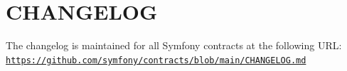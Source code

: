 \chapter{CHANGELOG }
\hypertarget{md_vendor_2symfony_2deprecation-contracts_2_c_h_a_n_g_e_l_o_g}{}\label{md_vendor_2symfony_2deprecation-contracts_2_c_h_a_n_g_e_l_o_g}
The changelog is maintained for all Symfony contracts at the following URL:\+ \href{https://github.com/symfony/contracts/blob/main/CHANGELOG.md}{\texttt{https:\+/\+/\+github.\+com/\+symfony/\+contracts/\+blob/\+main/\+\+CHANGELOG.\+md}} 